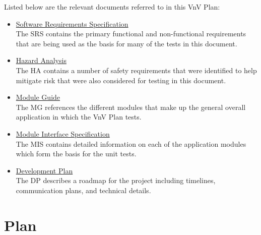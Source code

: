 \documentclass[12pt, titlepage]{article}
\begin{document}
Listed below are the relevant documents referred to in this VnV Plan:

\begin{itemize}
  \item \href{https://github.com/r-yeh/grocery-spending-tracker/blob/master/docs/SRS/SRS.pdf}{Software Requirements Specification} \citet{GrocerySRS}\\
  The SRS contains the primary functional and non-functional requirements that are being used as the basis for many of the tests in this document.
  \item \href{https://github.com/r-yeh/grocery-spending-tracker/blob/master/docs/HazardAnalysis/HazardAnalysis.pdf}{Hazard Analysis} \citet{GroceryHA}\\
  The HA contains a number of safety requirements that were identified to help mitigate risk that were also considered for testing in this document.
  \item \href{https://github.com/r-yeh/grocery-spending-tracker/blob/master/docs/Design/SoftArchitecture/MG.pdf}{Module Guide}\\
  The MG references the different modules that make up the general overall application in which the VnV Plan tests.
  \item \href{https://github.com/r-yeh/grocery-spending-tracker/blob/master/docs/Design/SoftDetailedDes/MIS.pdf}{Module Interface Specification}\\
  The MIS contains detailed information on each of the application modules which form the basis for the unit tests.
  \item \href{https://github.com/r-yeh/grocery-spending-tracker/blob/master/docs/DevelopmentPlan/DevelopmentPlan.pdf}{Development Plan} \citet{GroceryDP}\\
  The DP describes a roadmap for the project including timelines, communication plans, and technical details.
\end{itemize}

\section{Plan}
\end{document}
